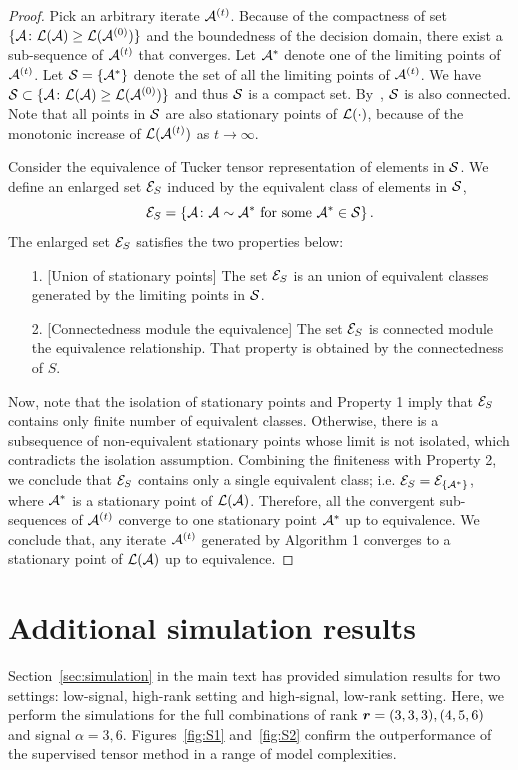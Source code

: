 \documentclass[12pt]{article}
\theoremstyle{definition}
\theoremstyle{definition}
\begin{document}
\begin{proof}
Pick an arbitrary iterate $\mathcal{A}^{(t)}$.  Because of the compactness of set $\{\mathcal{A}\colon  \mathcal{L}(\mathcal{A}) \geq \mathcal{L}(\mathcal{A}^{(0)}) \}$ and the boundedness of the decision domain, there exist a sub-sequence of $\mathcal{A}^{(t)}$ that converges. Let $\mathcal{A}^*$ denote one of the limiting points of $\mathcal{A}^{(t)}$. Let $\mathcal{S} = \{\mathcal{A}^*\}$ denote the set of all the limiting points of $\mathcal{A}^{(t)}$. We have $\mathcal{S} \subset \{\mathcal{A}\colon  \mathcal{L}(\mathcal{A}) \geq \mathcal{L}(\mathcal{A}^{(0)}) \}$ and thus $\mathcal{S}$ is a compact set. By~\citet[Propositions 8.2.1 and 13.4.2]{Lange:2012:NAS:2432073}, $\mathcal{S}$ is also connected. Note that all points in $\mathcal{S}$ are also stationary points of $\mathcal{L}(\cdot)$, because of the monotonic increase of $\mathcal{L}(\mathcal{A}^{(t)})$ as $t \rightarrow \infty$. 
 
 
 Consider the equivalence of Tucker tensor representation of elements in $\mathcal{S}$. We define an enlarged set $\mathcal{E}_S$ induced by the equivalent class of elements in $\mathcal{S}$,
\begin{equation}
 \mathcal{E}_S = \left\{\mathcal{A}\colon \mathcal{A}\sim \mathcal{A}^* \text{ for some }\mathcal{A}^* \in \mathcal{S}\right\}.
\end{equation}
The enlarged set $\mathcal{E}_S$ satisfies the two properties below:
 \begin{enumerate}
\item [1.] [Union of stationary points] The set $\mathcal{E}_S$ is an union of equivalent  classes generated by the limiting points in $\mathcal{S}$.
\item [2.] [Connectedness module the equivalence]  The set $\mathcal{E}_S$ is connected module the equivalence relationship. That property is obtained by the connectedness of $S$.
 \end{enumerate}
Now, note that the isolation of stationary points and Property 1 imply that $\mathcal{E}_S$ contains only finite number of equivalent classes. Otherwise, there is a subsequence of non-equivalent stationary points whose limit is not isolated, which contradicts the isolation assumption. Combining the finiteness with Property 2, we conclude that $\mathcal{E}_S$ contains only a single equivalent class; i.e. $\mathcal{E}_S = \mathcal{E}_{\{\mathcal{A}^*\}}$, where $\mathcal{A}^*$ is a stationary point of $\mathcal{L}(\mathcal{A})$. Therefore, all the convergent sub-sequences of $\mathcal{A}^{(t)}$ converge to one stationary point $\mathcal{A}^*$ up to equivalence. We conclude that, any iterate $\mathcal{A}^{(t)}$ generated by Algorithm 1 converges to a stationary point of $\mathcal{L}(\mathcal{A})$ up to equivalence.
 \end{proof}


\newpage
\section{Additional simulation results}
Section~\ref{sec:simulation} in the main text has provided simulation results for two settings: low-signal, high-rank setting and high-signal, low-rank setting. Here, we perform the simulations for the full combinations of rank $\bm{r}=(3,3,3), (4,5,6)$ and signal $\alpha=3, 6$. Figures~\ref{fig:S1} and~\ref{fig:S2} confirm the outperformance of the supervised tensor method in a range of model complexities.
\end{document}
